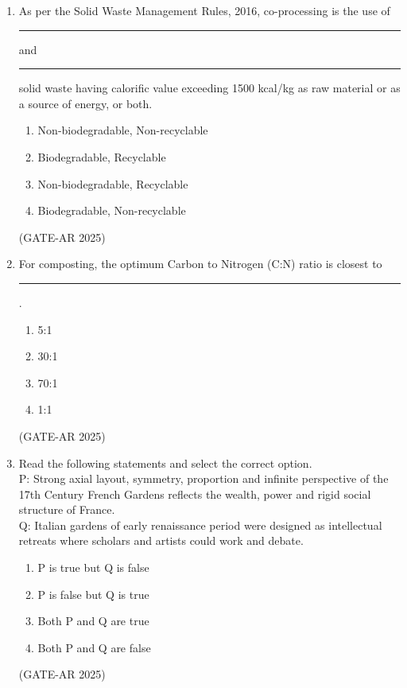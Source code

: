 \documentclass[a4paper,10pt]{article}
\begin{document}
\begin{enumerate}
    \item As per the Solid Waste Management Rules, 2016, co-processing is the use of \rule{2cm}{0.4pt} and \rule{2cm}{0.4pt} solid waste having calorific value exceeding 1500 kcal/kg as raw material or as a source of energy, or both.
    \begin{enumerate}
        \item Non-biodegradable, Non-recyclable
        \item Biodegradable, Recyclable
        \item Non-biodegradable, Recyclable
        \item Biodegradable, Non-recyclable
    \end{enumerate}
    \hfill (GATE-AR 2025)

    \item For composting, the optimum Carbon to Nitrogen (C:N) ratio is closest to \rule{2cm}{0.4pt}.
    \begin{multicols}{4}
    \begin{enumerate}
        \item 5:1
        \item 30:1
        \item 70:1
        \item 1:1
    \end{enumerate}
    \end{multicols}
    \hfill (GATE-AR 2025)

    \item Read the following statements and select the correct option.\\    
    P: Strong axial layout, symmetry, proportion and infinite perspective of the 17th Century French Gardens reflects the wealth, power and rigid social structure of France.\\    
    Q: Italian gardens of early renaissance period were designed as intellectual retreats where scholars and artists could work and debate.
    \begin{multicols}{2}
    \begin{enumerate}
        \item P is true but Q is false
        \item P is false but Q is true
        \item Both P and Q are true
        \item Both P and Q are false
    \end{enumerate}
    \end{multicols}
    \hfill (GATE-AR 2025)


\end{enumerate}
\end{document}

